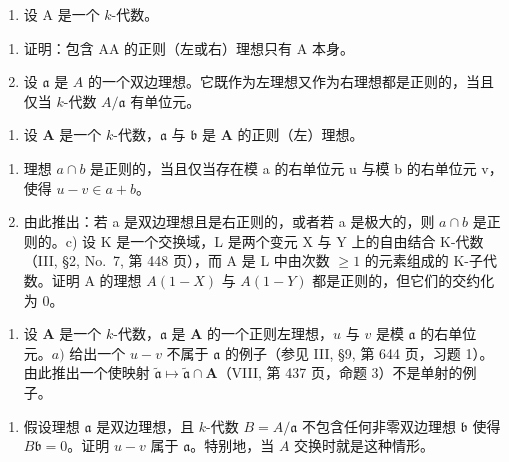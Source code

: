 
\begin{enumerate}
\def\labelenumi{\arabic{enumi})}
\tightlist
\item
  设 \(\mathrm{A}\) 是一个 \(k\)-代数。
\end{enumerate}

\begin{enumerate}
\def\labelenumi{\alph{enumi})}
\item
  证明：包含 AA 的正则（左或右）理想只有 A 本身。
\item
  设 \(\mathfrak{a}\) 是 \(A\) 的一个双边理想。它既作为左理想又作为右理想都是正则的，当且仅当 \(k\)-代数 \(A / \mathfrak{a}\) 有单位元。
\end{enumerate}

\begin{enumerate}
\def\labelenumi{\arabic{enumi})}
\setcounter{enumi}{1}
\tightlist
\item
  设 \(\mathbf{A}\) 是一个 \(k\)-代数，\(\mathfrak{a}\) 与 \(\mathfrak{b}\) 是 \(\mathbf{A}\) 的正则（左）理想。
\end{enumerate}

\begin{enumerate}
\def\labelenumi{\alph{enumi})}
\item
  理想 \(a \cap b\) 是正则的，当且仅当存在模 a 的右单位元 u 与模 b 的右单位元 v，使得 \(u - v \in a + b\)。
\item
  由此推出：若 a 是双边理想且是右正则的，或者若 a 是极大的，则 \(a \cap b\) 是正则的。c) 设 K 是一个交换域，L 是两个变元 X 与 Y 上的自由结合 K-代数（III, §2, No.~7, 第 448 页），而 A 是 L 中由次数 \(\geqslant 1\) 的元素组成的 K-子代数。证明 A 的理想 \(A(1 - X)\) 与 \(A(1 - Y)\) 都是正则的，但它们的交约化为 0。
\end{enumerate}

\begin{enumerate}
\def\labelenumi{\arabic{enumi})}
\setcounter{enumi}{2}
\tightlist
\item
  设 \(\mathbf{A}\) 是一个 \(k\)-代数，\(\mathfrak{a}\) 是 \(\mathbf{A}\) 的一个正则左理想，\(u\) 与 \(v\) 是模 \(\mathfrak{a}\) 的右单位元。\(a)\) 给出一个 \(u - v\) 不属于 \(\mathfrak{a}\) 的例子（参见 III, §9, 第 644 页，习题 1）。由此推出一个使映射 \(\widetilde{\mathfrak{a}} \mapsto \widetilde{\mathfrak{a}} \cap \mathbf{A}\)（VIII, 第 437 页，命题 3）不是单射的例子。
\end{enumerate}

\begin{enumerate}
\def\labelenumi{\alph{enumi})}
\setcounter{enumi}{1}
\tightlist
\item
  假设理想 \(\mathfrak{a}\) 是双边理想，且 \(k\)-代数 \(B = A / \mathfrak{a}\) 不包含任何非零双边理想 \(\mathfrak{b}\) 使得 \(B\mathfrak{b} = 0\)。证明 \(u - v\) 属于 \(\mathfrak{a}\)。特别地，当 \(A\) 交换时就是这种情形。
\end{enumerate}


